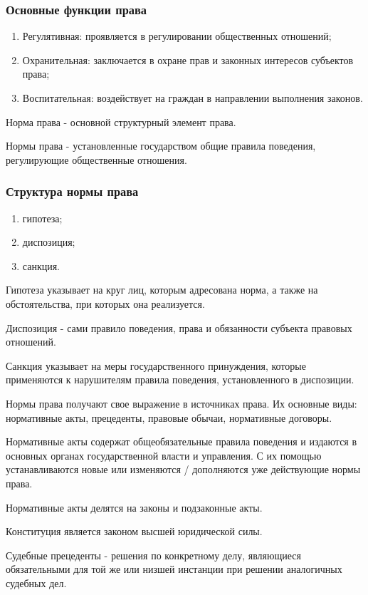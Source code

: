 \subsubsection{Основные функции права}
\begin{enumerate}
	\item Регулятивная: проявляется в регулировании общественных отношений;
	\item Охранительная: заключается в охране прав и законных интересов субъектов права;
	\item Воспитательная: воздействует на граждан в направлении выполнения законов.
\end{enumerate}

Норма права - основной структурный элемент права.

Нормы права - установленные государством общие правила поведения, регулирующие общественные отношения.
\subsubsection{Структура нормы права}
\begin{enumerate}
	\item гипотеза;
	\item диспозиция;
	\item санкция.
\end{enumerate}

Гипотеза указывает на круг лиц, которым адресована норма, а также на обстоятельства, при которых она реализуется.

Диспозиция - сами правило поведения, права и обязанности субъекта правовых отношений.

Санкция указывает на меры государственного принуждения, которые применяются к нарушителям правила поведения, установленного в диспозиции.

Нормы права получают свое выражение в источниках права. Их основные виды: нормативные акты, прецеденты, правовые обычаи, нормативные договоры.

Нормативные акты содержат общеобязательные правила поведения и издаются в основных органах государственной власти и управления. С их помощью устанавливаются новые или изменяются / дополняются уже действующие нормы права.

Нормативные акты делятся на законы и подзаконные акты.

Конституция является законом высшей юридической силы.

Судебные прецеденты - решения по конкретному делу, являющиеся обязательными для той же или низшей инстанции при решении аналогичных судебных дел.

